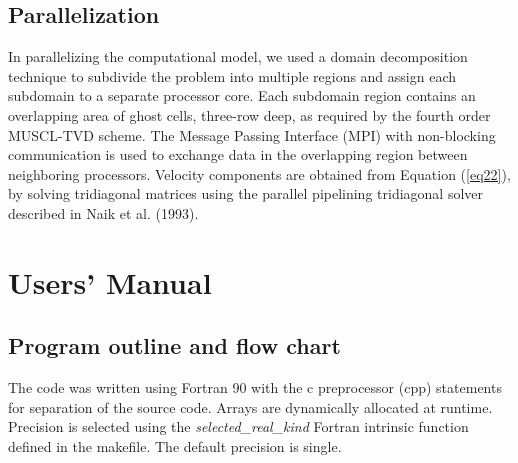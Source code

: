 \documentclass[11pt]{article}
\begin{document}
\subsection{Parallelization}

In parallelizing the computational model, we used a domain decomposition technique to subdivide the problem into multiple regions and assign each subdomain to a separate processor core. Each 
subdomain region contains an overlapping area of ghost cells,  three-row deep, as required by the fourth order MUSCL-TVD scheme. The Message Passing Interface (MPI) with non-blocking communication is used to exchange  data in the overlapping region between neighboring processors. 
 Velocity components are obtained 
from Equation (\ref{eq22}),  by solving tridiagonal matrices using the parallel pipelining 
tridiagonal solver described in Naik et al. (1993). 




\section{Users' Manual}

\subsection{Program outline and flow chart}

The code was written using Fortran 90 with the c preprocessor (cpp) statements for separation of the source code. Arrays are dynamically allocated at runtime. Precision is selected using the {\em selected\_real\_kind} Fortran intrinsic function defined in the makefile.  The default precision is single. 
\end{document}
